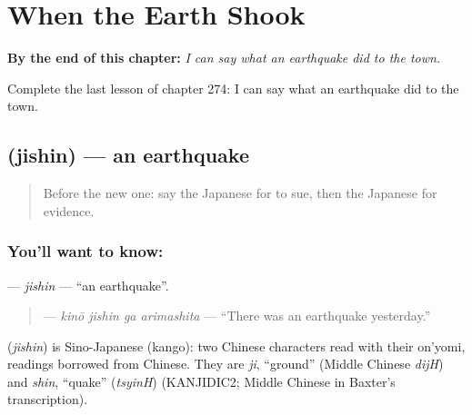 
\chapter{When the Earth Shook}
\label{ch:ja-when-the-earth-shook}

\begin{chapteropening}
\textbf{By the end of this chapter:} \emph{I can say what an earthquake did to the town.}

Complete the last lesson of chapter 274: I can say what an earthquake did to the town.
\end{chapteropening}

\section[\texorpdfstring{\ja{じしん} (jishin)}{じしん (jishin)}]{ (jishin) — an earthquake}

\label{lesson:JA-C274-jishin}



\begin{quote}
Before the new one: say the Japanese for to sue, then the Japanese for evidence.
\end{quote}

\subsection*{You'll want to know: }
\textbf{} — \emph{jishin} — \textquotedblleft{}an earthquake\textquotedblright{}.

\begin{quote}
\textbf{  } — \emph{kinō jishin ga arimashita} — \textquotedblleft{}There was an earthquake yesterday.\textquotedblright{}
\end{quote}

\begin{cousinweb}
\textbf{} (\emph{jishin}) is Sino-Japanese (kango): two Chinese characters read with their on'yomi, readings borrowed from Chinese. They are \emph{ji}, \textquotedblleft{}ground\textquotedblright{} (Middle Chinese \emph{dijH}) and \emph{shin}, \textquotedblleft{}quake\textquotedblright{} (\emph{tsyinH}) (KANJIDIC2; Middle Chinese in Baxter's transcription).
\end{cousinweb}

